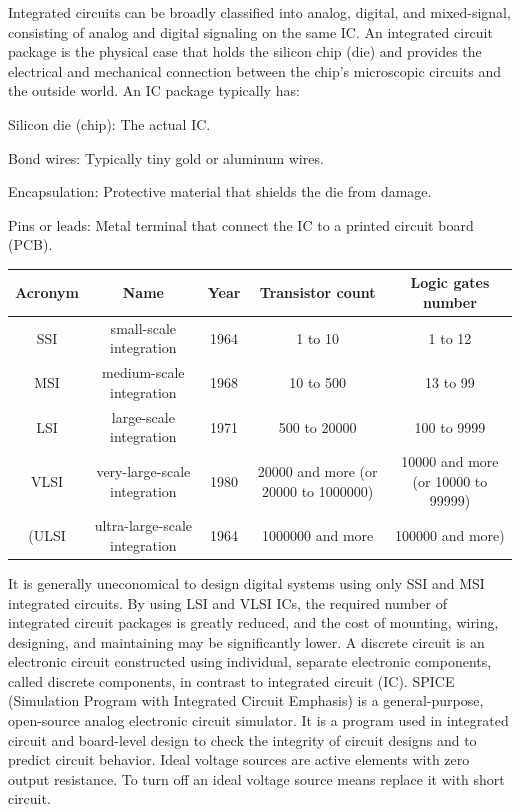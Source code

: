 \documentclass[a4paper,12pt]{article}
\begin{document}
Integrated circuits can be broadly classified into analog, digital, and mixed-signal, consisting of analog and digital signaling on the same IC.
An integrated circuit package is the physical case that holds the silicon chip (die) and provides the electrical and mechanical connection between the chip’s microscopic circuits and the outside world. An IC package typically has:
\bit
\item Silicon die (chip): The actual IC.
\item Bond wires: Typically tiny gold or aluminum wires.
\item Encapsulation: Protective material that shields the die from damage.
\item Pins or leads: Metal terminal that connect the IC to a printed circuit board (PCB).
\eit
{}
\begin{longtable}[c]{|c|c|c|c|c|}
    \hline
    Acronym & Name & Year & Transistor count & Logic gates number \\\hline
    SSI & small-scale integration & 1964 & 1 to 10 & 1 to 12 \\\hline
    MSI & medium-scale integration & 1968 & 10 to 500 & 13 to 99 \\\hline
    LSI & large-scale integration & 1971 & 500 to 20000 & 100 to 9999 \\\hline
    VLSI & very-large-scale integration & 1980 & 20000 and more (or 20000 to 1000000) & 10000 and more (or 10000 to 99999) \\\hline
    (ULSI & ultra-large-scale integration & 1964 & 1000000 and more & 100000 and more) \\\hline
\end{longtable}
It is generally uneconomical to design digital systems using only SSI and MSI integrated circuits. By using LSI and VLSI ICs, the required number of integrated circuit packages is greatly reduced, and the cost of mounting, wiring, designing, and maintaining may be significantly lower.
A discrete circuit is an electronic circuit constructed using individual, separate electronic components, called discrete components, in contrast to integrated circuit (IC).
SPICE (Simulation Program with Integrated Circuit Emphasis) is a general-purpose, open-source analog electronic circuit simulator. It is a program used in integrated circuit and board-level design to check the integrity of circuit designs and to predict circuit behavior.
Ideal voltage sources are active elements with zero output resistance. To turn off an ideal voltage source means replace it with short circuit.
\end{document}
